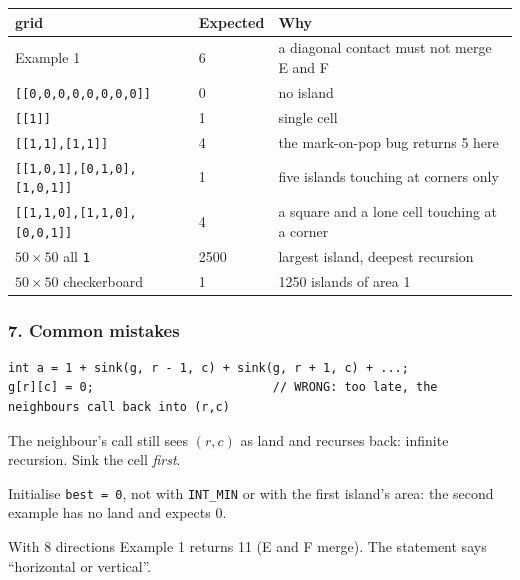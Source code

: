 \begin{testbox}
\centering\small
\begin{tabular}{@{}lll@{}}
\toprule
\textbf{grid} & \textbf{Expected} & \textbf{Why} \\
\midrule
Example 1 & 6 & a diagonal contact must not merge E and F \\
\texttt{[[0,0,0,0,0,0,0,0]]} & 0 & no island \\
\texttt{[[1]]} & 1 & single cell \\
\texttt{[[1,1],[1,1]]} & 4 & the mark-on-pop bug returns 5 here \\
\texttt{[[1,0,1],[0,1,0],[1,0,1]]} & 1 & five islands touching at corners only \\
\texttt{[[1,1,0],[1,1,0],[0,0,1]]} & 4 & a square and a lone cell touching at a corner \\
$50\times50$ all \texttt{1} & 2500 & largest island, deepest recursion \\
$50\times50$ checkerboard & 1 & 1250 islands of area 1 \\
\bottomrule
\end{tabular}
\end{testbox}

\subsubsection*{7. Common mistakes}

\begin{warningbox}
\begin{lstlisting}[style=snippet]
int a = 1 + sink(g, r - 1, c) + sink(g, r + 1, c) + ...;
g[r][c] = 0;                         // WRONG: too late, the neighbours call back into (r,c)
\end{lstlisting}
The neighbour's call still sees $(r,c)$ as land and recurses back: infinite recursion. Sink the cell \emph{first}.
\end{warningbox}

\begin{warningbox}
Initialise \texttt{best = 0}, not with \texttt{INT\_MIN} or with the first island's area: the second example has no land and expects 0.
\end{warningbox}

\begin{warningbox}
With 8 directions Example 1 returns 11 (E and F merge). The statement says ``horizontal or vertical''.
\end{warningbox}

